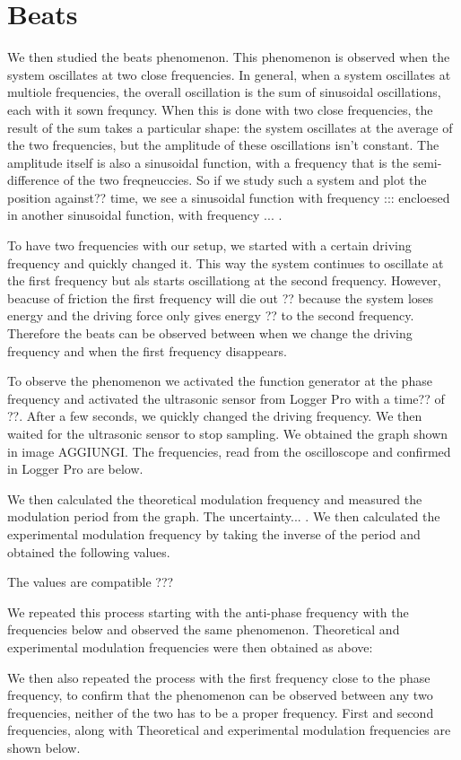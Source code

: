 \documentclass{article}
\begin{document}
\section{Beats}
We then studied the beats phenomenon. This phenomenon is observed when the system oscillates at two close frequencies. In general, when a system oscillates at multiole frequencies, the overall oscillation is the sum of sinusoidal oscillations, each with it sown frequncy. When this is done with two close frequencies, the result of the sum takes a particular shape: the system oscillates at the average of the two frequencies, but the amplitude of these oscillations isn't constant. The amplitude itself is also a sinusoidal function, with a frequency that is the semi-difference of the two freqneuccies. So if we study such a system and plot the position against?? time, we see a sinusoidal function with frequency ::: encloesed in another sinusoidal function, with frequency ... . 

To have two frequencies with our setup, we started with a certain driving frequency and quickly changed it. This way the system continues to oscillate at the first frequency but als starts oscillationg at the second frequency. However, beacuse of friction the first frequency will die out ?? because the system loses energy and the driving force only gives energy ?? to the second frequency. Therefore the beats can be observed between when we change the driving frequency and when the first frequency disappears. 

To observe the phenomenon we activated the function generator at the phase frequency and activated the ultrasonic sensor from Logger Pro with a time?? of ??. After a few seconds, we quickly changed the driving frequency. We then waited for the ultrasonic sensor to stop sampling. We obtained the graph shown in image AGGIUNGI. The frequencies, read from the oscilloscope and confirmed in Logger Pro are below.

We then calculated the theoretical modulation frequency and measured the modulation period from the graph. The uncertainty... . We then calculated the experimental modulation frequency by taking the inverse of the period and obtained the following values. 

The values are compatible ???

We repeated this process starting with the anti-phase frequency with the frequencies below and observed the same phenomenon. Theoretical and experimental modulation frequencies were then obtained as above:

We then also repeated the process with the first frequency close to the phase frequency, to confirm that the phenomenon can be observed between any two frequencies, neither of the two has to be a proper frequency. First and second frequencies, along with Theoretical and experimental modulation frequencies are shown below.
\end{document}
